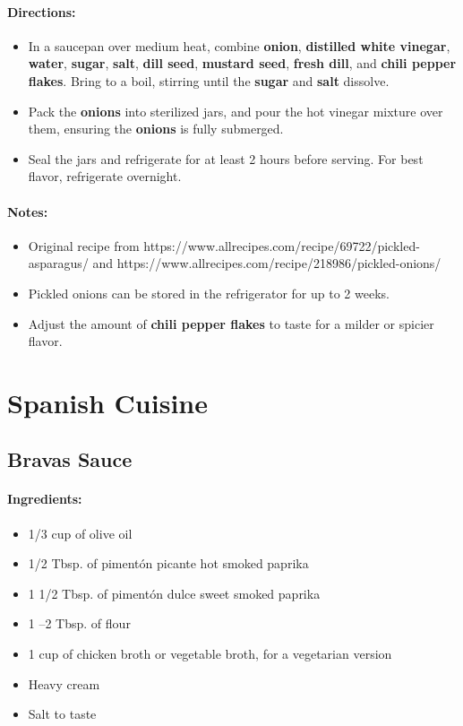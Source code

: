 \documentclass{article}
\begin{document}
\paragraph{Directions:}
\begin{itemize}
    \item In a saucepan over medium heat, combine \textbf{onion}, \textbf{distilled white vinegar}, \textbf{water}, \textbf{sugar}, \textbf{salt}, \textbf{dill seed}, \textbf{mustard seed}, \textbf{fresh dill}, and \textbf{chili pepper flakes}. Bring to a boil, stirring until the \textbf{sugar} and \textbf{salt} dissolve.
    \item Pack the \textbf{onions} into sterilized jars, and pour the hot vinegar mixture over them, ensuring the \textbf{onions} is fully submerged.
    \item Seal the jars and refrigerate for at least 2 hours before serving. For best flavor, refrigerate overnight.
\end{itemize}

\paragraph{Notes:}
\begin{itemize}
    \item Original recipe from https://www.allrecipes.com/recipe/69722/pickled-asparagus/ and https://www.allrecipes.com/recipe/218986/pickled-onions/
    \item Pickled onions can be stored in the refrigerator for up to 2 weeks.
    \item Adjust the amount of \textbf{chili pepper flakes} to taste for a milder or spicier flavor.
\end{itemize}

\section{Spanish Cuisine}


\subsection{Bravas Sauce}

\paragraph{Ingredients:}
\begin{itemize}
    \item 1/3 cup of olive oil
    \item 1/2 Tbsp. of pimentón picante hot smoked paprika
    \item 1 1/2 Tbsp. of pimentón dulce sweet smoked paprika
    \item 1 –2 Tbsp. of flour
    \item 1 cup of chicken broth or vegetable broth, for a vegetarian version
    \item Heavy cream
    \item Salt to taste
\end{itemize}
\end{document}
